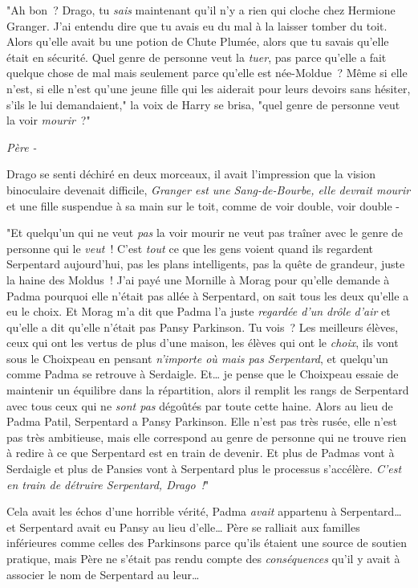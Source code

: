 "Ah bon~? Drago, tu \emph{sais} maintenant qu'il n'y a rien qui cloche chez Hermione Granger. J'ai entendu dire que tu avais eu du mal à la laisser tomber du toit. Alors qu'elle avait bu une potion de Chute Plumée, alors que tu savais qu'elle était en sécurité. Quel genre de personne veut la \emph{tuer}, pas parce qu'elle a fait quelque chose de mal mais seulement parce qu'elle est née-Moldue~? Même si elle n'est, si elle n'est qu'une jeune fille qui les aiderait pour leurs devoirs sans hésiter, s'ils le lui demandaient," la voix de Harry se brisa, "quel genre de personne veut la voir \emph{mourir}~?"

\emph{Père -}

Drago se senti déchiré en deux morceaux, il avait l'impression que la vision binoculaire devenait difficile, \emph{Granger est une Sang-de-Bourbe, elle devrait mourir} et une fille suspendue à sa main sur le toit, comme de voir double, voir double -

"Et quelqu'un qui ne veut \emph{pas} la voir mourir ne veut pas traîner avec le genre de personne qui le \emph{veut}~! C'est \emph{tout} ce que les gens voient quand ils regardent Serpentard aujourd'hui, pas les plans intelligents, pas la quête de grandeur, juste la haine des Moldus~! J'ai payé une Mornille à Morag pour qu'elle demande à Padma pourquoi elle n'était pas allée à Serpentard, on sait tous les deux qu'elle a eu le choix. Et Morag m'a dit que Padma l'a juste \emph{regardée d'un drôle d'air} et qu'elle a dit qu'elle n'était pas Pansy Parkinson. Tu vois~? Les meilleurs élèves, ceux qui ont les vertus de plus d'une maison, les élèves qui ont le \emph{choix}, ils vont sous le Choixpeau en pensant \emph{n'importe où mais pas Serpentard}, et quelqu'un comme Padma se retrouve à Serdaigle. Et… je pense que le Choixpeau essaie de maintenir un équilibre dans la répartition, alors il remplit les rangs de Serpentard avec tous ceux qui ne \emph{sont pas} dégoûtés par toute cette haine. Alors au lieu de Padma Patil, Serpentard a Pansy Parkinson. Elle n'est pas très rusée, elle n'est pas très ambitieuse, mais elle correspond au genre de personne qui ne trouve rien à redire à ce que Serpentard est en train de devenir. Et plus de Padmas vont à Serdaigle et plus de Pansies vont à Serpentard plus le processus s'accélère. \emph{C'est en train de détruire Serpentard, Drago~!}"

Cela avait les échos d'une horrible vérité, Padma \emph{avait} appartenu à Serpentard… et Serpentard avait eu Pansy au lieu d'elle… Père se ralliait aux familles inférieures comme celles des Parkinsons parce qu'ils étaient une source de soutien pratique, mais Père ne s'était pas rendu compte des \emph{conséquences} qu'il y avait à associer le nom de Serpentard au leur…

